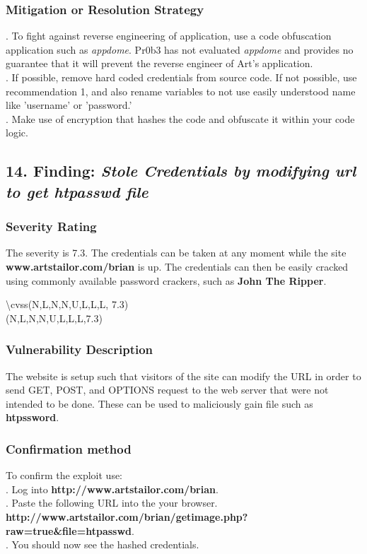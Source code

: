 \documentclass[notitlepage]{article}
\begin{document}
	\subsubsection{Mitigation or Resolution Strategy}
	. To fight against reverse engineering of application, use a code obfuscation application such as \textit{appdome}.  Pr0b3 has not evaluated \textit{appdome} and provides no guarantee that it will prevent the reverse engineer of Art's application. \\
	. If possible, remove hard coded credentials from source code.  If not possible, use recommendation 1, and also rename variables to not use easily understood name like 'username' or 'password.' \\
	. Make use of encryption that hashes the code and obfuscate it within your code logic.  
	
	
		\subsection{14. Finding: \emph{Stole Credentials by modifying url to get htpasswd file}}
	
	\subsubsection{Severity Rating}
	\indent The severity is 7.3. The credentials can be taken at any moment while the site \textbf{www.artstailor.com/brian} is up. The credentials can then be easily cracked using commonly available password crackers, such as \textbf{John The Ripper}.
	
	\textbackslash cvss(N,L,N,N,U,L,L,L, 7.3)\\
	\cvss(N,L,N,N,U,L,L,L,7.3) \\
	
	\subsubsection{Vulnerability Description}
	\indent The website is setup such that visitors of the site can modify the URL in order to send GET, POST, and OPTIONS request to the web server that were not intended to be done.  These can be used to maliciously gain file such as \textbf{htpssword}.  \\
	
	\subsubsection{Confirmation method}
	To confirm the exploit use: \\
	. Log into \textbf{http://www.artstailor.com/brian}.  \\
	. Paste the following URL into the your browser. \textbf{http://www.artstailor.com/brian/getimage.php?raw=true\&file=htpasswd}.\\  
	. You should now see the  hashed credentials. \\
\end{document}
